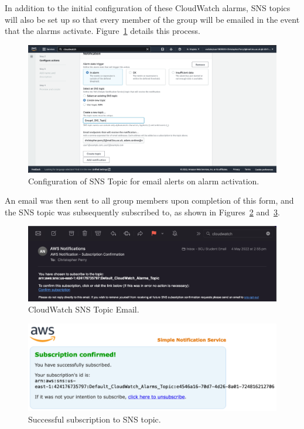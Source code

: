 In addition to the initial configuration of these CloudWatch alarms, SNS topics will also be set up so that every member
of the group will be emailed in the event that the alarms activate.
Figure~\ref{fig:cloudwatch-sns-topic} details this process.

\begin{figure}[!htbp]
    \centering
    \includegraphics[width=\textwidth]{resources/cloudwatch/cloudwatch-sns-topic}
    \caption{Configuration of SNS Topic for email alerts on alarm activation.}
    \label{fig:cloudwatch-sns-topic}
\end{figure}

\clearpage
An email was then sent to all group members upon completion of this form, and the SNS topic was subsequently subscribed
to, as shown in Figures~\ref{fig:cloudwatch-sns-email} and~\ref{fig:cloudwatch-sns-success}.

\begin{figure}[!htbp]
    \centering
    \includegraphics[width=\textwidth]{resources/cloudwatch/cloudwatch-email}
    \caption{CloudWatch SNS Topic Email.}
    \label{fig:cloudwatch-sns-email}
\end{figure}

\begin{figure}[!htbp]
    \centering
    \includegraphics[width=\textwidth]{resources/cloudwatch/cloudwatch-alarm-success}
    \caption{Successful subscription to SNS topic.}
    \label{fig:cloudwatch-sns-success}
\end{figure}

